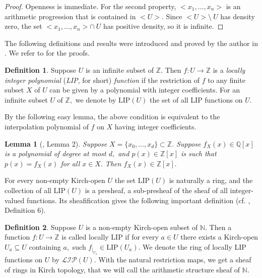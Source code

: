 \documentclass[10pt]{article}
\newtheorem{lemma}[theorem]{Lemma}
\theoremstyle{definition}
\newtheorem{definition}{Definition}
\begin{document}
\begin{proof} Openness is immediate. For the second property, $<x_1,\dots,x_n>$ is an arithmetic progression that is contained in $<U>$. Since $<U>\setminus\  U$ has density zero, the set   $<x_1,\dots,x_n>\cap \ U$ has positive density, so it is infinite.
\end{proof}

The following definitions and results were introduced and proved by the author in \cite{LIP}. We refer to \cite{LIP} for the proofs.

\begin{definition} Suppose $U$ is an infinite subset of $\mathbb Z.$ Then $f\colon U \to \mathbb Z$ is a {\it locally integer polynomial} ({\it LIP}, for short) {\it function} if the restriction of $f$ to any finite subset $X$ of $U$ can be given by a polynomial with integer coefficients.  For an infinite subset $U$ of $\mathbb Z,$ we denote by $\text{LIP}(U)$ the set of all  LIP functions on $U.$
\end{definition}

By the following easy lemma, the above condition is equivalent to the interpolation polynomial of $f$ on $X$ having integer coefficients.
 
\begin{lemma} [\cite{LIP}, Lemma 2] Suppose $X=\{x_0,\ldots ,x_d\}\subset \mathbb Z.$ Suppose $f_X(x)\in \mathbb Q[x]$ is a polynomial of degree at most $d,$ and $p(x)\in \mathbb Z[x]$ is such that   $p(x)=f_X(x)$ for all $x\in X.$ Then $f_X(x)\in \mathbb Z[x].$
\end{lemma}

For every non-empty Kirch-open $U$ the set $\text{LIP}(U)$ is naturally a ring, and the collection of all  $\text{LIP}(U)$ is a presheaf, a sub-presheaf of the sheaf of all integer-valued functions. Its sheafification gives the following important definition (cf. \cite{LIP}, Definition 6).
 
\begin{definition}
Suppose $U$ is a non-empty Kirch-open subset of $\mathbb N.$ Then a function $f:U\to \mathbb Z$ is called locally LIP if for every $a\in U$ there exists a Kirch-open  $U_a\subseteq U$ containing $a,$ such  $f_{|_{U_a}}\in \text{LIP}(U_a).$ We  denote the ring of locally LIP functions on $U$ by $\mathcal {LIP}(U).$ With the natural restriction maps, we get a sheaf of rings in Kirch topology, that we will call the arithmetic structure sheaf of $\mathbb N.$
\end{definition}
\end{document}
